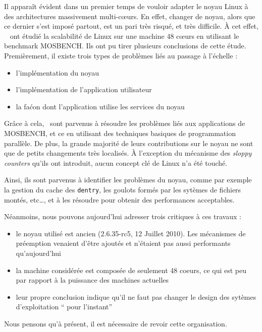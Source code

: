       Il apparaît évident dans un premier temps de vouloir adapter le noyau
      Linux à des architectures massivement multi-c\oe urs. En effet, changer de
      noyau, alors que ce dernier s’est imposé partout, est un pari très risqué,
      et très difficile. À cet effet, ~\citet{boyd2010analysis} ont étudié la
      scalabilité de Linux sur une machine 48 c\oe urs en utilisant le benchmark
      MOSBENCH. Ils ont pu tirer plusieurs conclusions de cette étude.
      Premièrement, il existe trois types de problèmes liés au passage à
      l’échelle :
      \begin{itemize}
        \item l’implémentation du noyau
        \item l’implémentation de l’application utilisateur
        \item la faćon dont l’application utilise les services du noyau
      \end{itemize}
      Grâce à cela,~\citeauthor{boyd2010analysis} sont parvenus à résoudre les
      problèmes liés aux applications de MOSBENCH, et ce en utilisant des
      techniques basiques de programmation parallèle. De plus, la grande
      majorité de leurs contributions sur le noyau ne sont que de petits
      changements très localisés. À l’exception du mécanisme des \textit{sloppy
        counters} qu'ils ont introduit, aucun concept clé de Linux n'a été
      touché. 

      Ainsi, ils sont parvenus à identifier les problèmes du noyau, comme par
      exemple la gestion du cache des \texttt{dentry}, les goulots formés par
      les sytèmes de fichiers montés, etc\ldots, et à les résoudre pour obtenir
      des performances acceptables.

      Néanmoins, nous pouvons aujourd’hui adresser trois critiques à ces travaux
      :
      \begin{itemize}
        \item le noyau utilisé est ancien (2.6.35-rc5, 12 Juillet 2010). Les
          mécanismes de préemption venaient d’être ajoutés et n’étaient pas
          aussi performants qu'aujourd'hui
        \item la machine considérée est composée de seulement 48 coeurs, ce qui
          est peu par rapport à la puissance des machines actuelles
        \item leur propre conclusion indique qu’il ne faut pas changer le design
          des sytèmes d’exploitation `` pour l’instant''
      \end{itemize}
      Nous pensons qu’à présent, il est nécessaire de revoir cette organisation.

